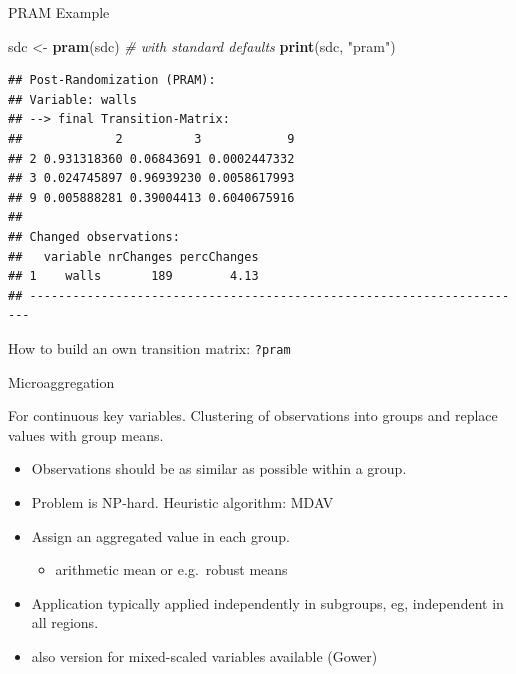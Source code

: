 \documentclass[ignorenonframetext,]{beamer}
\newenvironment{Shaded}{\begin{snugshade}}{\end{snugshade}}
\newcommand{\CommentTok}[1]{\textcolor[rgb]{0.56,0.35,0.01}{\textit{#1}}}
\newcommand{\KeywordTok}[1]{\textcolor[rgb]{0.13,0.29,0.53}{\textbf{#1}}}
\newcommand{\NormalTok}[1]{#1}
\newcommand{\StringTok}[1]{\textcolor[rgb]{0.31,0.60,0.02}{#1}}
\providecommand{\tightlist}{%
  \setlength{\itemsep}{0pt}\setlength{\parskip}{0pt}}
\begin{document}
\begin{frame}[fragile]{PRAM Example}
\protect\hypertarget{pram-example-1}{}

\begin{Shaded}
\begin{Highlighting}[]
\NormalTok{sdc <-}\StringTok{ }\KeywordTok{pram}\NormalTok{(sdc) }\CommentTok{# with standard defaults}
\KeywordTok{print}\NormalTok{(sdc, }\StringTok{"pram"}\NormalTok{)}
\end{Highlighting}
\end{Shaded}

\begin{verbatim}
## Post-Randomization (PRAM):
## Variable: walls 
## --> final Transition-Matrix:
##             2          3            9
## 2 0.931318360 0.06843691 0.0002447332
## 3 0.024745897 0.96939230 0.0058617993
## 9 0.005888281 0.39004413 0.6040675916
## 
## Changed observations:
##   variable nrChanges percChanges
## 1    walls       189        4.13
## ----------------------------------------------------------------------
\end{verbatim}

How to build an own transition matrix: \texttt{?pram}

\end{frame}

\begin{frame}{Microaggregation}
\protect\hypertarget{microaggregation}{}

For continuous key variables. Clustering of observations into groups and
replace values with group means.

\begin{itemize}
\tightlist
\item
  Observations should be as similar as possible within a group.
\item
  Problem is NP-hard. Heuristic algorithm: MDAV
\item
  Assign an aggregated value in each group.

  \begin{itemize}
  \tightlist
  \item
    arithmetic mean or e.g.~robust means
  \end{itemize}
\item
  Application typically applied independently in subgroups, eg,
  independent in all regions.
\item
  also version for mixed-scaled variables available (Gower)
\end{itemize}

\end{frame}
\end{document}
